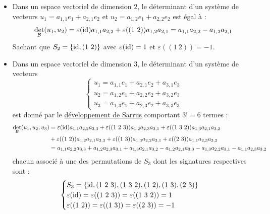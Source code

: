 \documentclass[12pt, a4paper]{report}
\begin{document}
\begin{remark}
    \begin{itemize}
        \item Dans un espace vectoriel de dimension $2$, le déterminant d'un système de vecteurs $u_1 = a_{1,1} e_1 + a_{2,1} e_2$ et $u_2 = a_{1,2} e_1 + a_{2,2} e_2$ est égal à :
        $$\det_{\mathcal{B}}(u_1, u_2) = \varepsilon(\mathrm{id}) a_{1,1} a_{2,2} + \varepsilon((1 \ 2)) a_{1,2} a_{2,1} = a_{1,1} a_{2,2} - a_{1,2} a_{2,1}$$
        Sachant que $S_2 = \{\mathrm{id}, (1 \ 2)\}$ avec $\varepsilon(\mathrm{id}) = 1$ et $\varepsilon((1 \ 2)) = -1$.
        
        \item Dans un espace vectoriel de dimension $3$, le déterminant d'un système de vecteurs
        $$\begin{cases}
            u_1 = a_{1,1} e_1 + a_{2,1} e_2 + a_{3,1} e_3 \\
            u_2 = a_{1,2} e_1 + a_{2,2} e_2 + a_{3,2} e_3 \\
            u_3 = a_{1,3} e_1 + a_{2,3} e_2 + a_{3,3} e_3
        \end{cases}$$
        est donné par le \href{https://www.bibmath.net/dico/index.php?action=affiche&quoi=./s/sarrus.html}{développement de Sarrus} comportant $3! = 6$ termes :
        \begin{align*}
            \det_{\mathcal{B}}(u_1, u_2, u_3) &= \varepsilon(\mathrm{id}) a_{1,1} a_{2,2} a_{3,3} + \varepsilon((1 \ 2 \ 3)) a_{1,2} a_{2,3} a_{3,1} + \varepsilon((1 \ 3 \ 2)) a_{1,3} a_{2,1} a_{3,2} \\
            &+ \varepsilon((1 \ 2)) a_{1,2} a_{2,1} a_{3,3} + \varepsilon((1 \ 3)) a_{1,3} a_{2,2} a_{3,1} + \varepsilon((2 \ 3)) a_{1,1} a_{2,3} a_{3,2} \\
            &= a_{1,1} a_{2,2} a_{3,3} + a_{1,2} a_{2,3} a_{3,1} + a_{1,3} a_{2,1} a_{3,2} - a_{1,2} a_{2,1} a_{3,3} - a_{1,3} a_{2,2} a_{3,1} - a_{1,1} a_{2,3} a_{3,2}
        \end{align*}
        chacun associé à une des permutations de $S_3$ dont les signatures respectives sont :
        $$
        \begin{cases} 
            S_3 = \{\mathrm{id}, (1 \ 2 \ 3), (1 \ 3 \ 2), (1 \ 2), (1 \ 3), (2 \ 3)\} \\
            \varepsilon(\mathrm{id}) = \varepsilon((1 \ 2 \ 3)) = \varepsilon((1 \ 3 \ 2)) = 1 \\
            \varepsilon((1 \ 2)) = \varepsilon((1 \ 3)) = \varepsilon((2 \ 3)) = -1
        \end{cases}
        $$


\end{itemize}
\end{remark}
\end{document}
